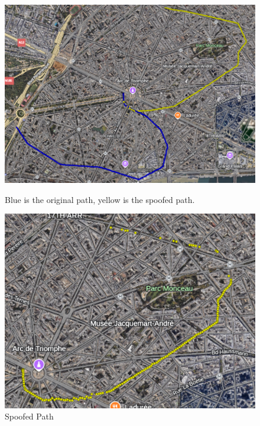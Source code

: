 \documentclass[12pt]{report}
\begin{document}
\begin{figure}[H]
  \centering
  \begin{minipage}{0.48\textwidth}
    \centering
    \includegraphics[width=\textwidth]{path1.png}
    \caption{Blue is the original path, yellow is the spoofed path.}
    \label{fig:path1}
  \end{minipage}
  \hfill
  \begin{minipage}{0.48\textwidth}
    \centering
    \includegraphics[width=\textwidth]{spoofed_path1.png}
    \caption{Spoofed Path}
    \label{fig:spoofed_path1}
  \end{minipage}
\end{figure}
\end{document}
